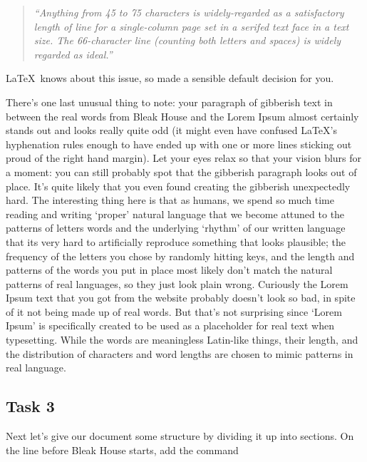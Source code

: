 \begin{refsection}
\begin{quote}
\emph{
``Anything from 45 to 75 characters is widely-regarded as a satisfactory length of line for a single-column page set in a serifed text face in a text size. The 66-character line (counting both letters and spaces) is widely regarded as ideal.''}
\end{quote}

\LaTeX\ knows about this issue, so made a sensible default decision for you. 

There's one last unusual thing to note: your paragraph of gibberish text in between the real words from Bleak House and the Lorem Ipsum almost certainly stands out and looks really quite odd (it might even have confused \LaTeX's hyphenation rules enough to have ended up with one or more lines sticking out proud of the right hand margin).  Let your eyes relax so that your vision blurs for a moment: you can still probably spot that the gibberish paragraph looks out of place. It's quite likely that you even found creating the gibberish unexpectedly hard. The interesting thing here is that as humans, we spend so much time reading and writing `proper' natural language that we become attuned to the patterns of letters words and the underlying `rhythm' of our written language that its very hard to artificially reproduce something that looks plausible; the frequency of the letters you chose by randomly hitting keys, and the length and patterns of the words you put in place most likely don't match the natural patterns of real languages, so they just look plain wrong.  Curiously the Lorem Ipsum text that you got from the website probably doesn't look so bad, in spite of it not being made up of real words. But that's not surprising since `Lorem Ipsum' is specifically created to be used as a placeholder for real text when typesetting. While the words are meaningless Latin-like things, their length, and the distribution of characters and word lengths are chosen to mimic patterns in real language.

\subsection{Task 3}
\label{sec:task-3}

Next let's give our document some structure by dividing it up into sections. On the line before Bleak House starts, add the command

\begin{verbatim}

\end{verbatim}
\end{refsection}
